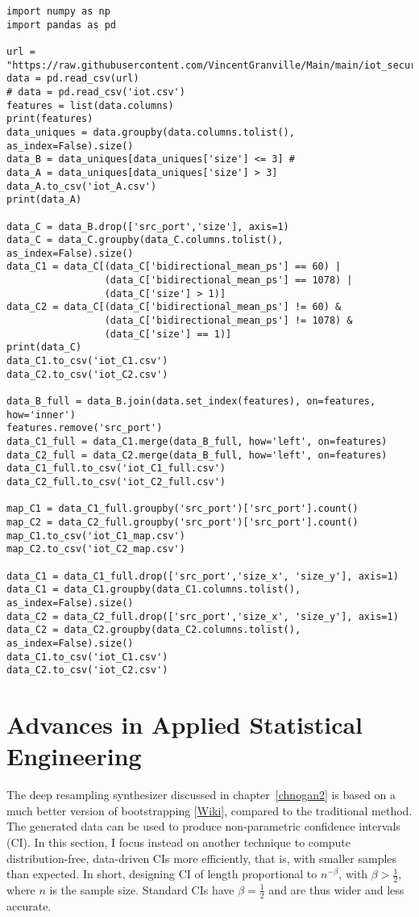 \documentclass[oneside,10pt]{book}
\begin{document}
\begin{lstlisting}
import numpy as np
import pandas as pd

url = "https://raw.githubusercontent.com/VincentGranville/Main/main/iot_security.csv"
data = pd.read_csv(url)
# data = pd.read_csv('iot.csv')
features = list(data.columns)
print(features)
data_uniques = data.groupby(data.columns.tolist(), as_index=False).size()
data_B = data_uniques[data_uniques['size'] <= 3] #
data_A = data_uniques[data_uniques['size'] > 3]
data_A.to_csv('iot_A.csv')
print(data_A)

data_C = data_B.drop(['src_port','size'], axis=1)
data_C = data_C.groupby(data_C.columns.tolist(), as_index=False).size()
data_C1 = data_C[(data_C['bidirectional_mean_ps'] == 60) |
                 (data_C['bidirectional_mean_ps'] == 1078) |
                 (data_C['size'] > 1)]
data_C2 = data_C[(data_C['bidirectional_mean_ps'] != 60) &
                 (data_C['bidirectional_mean_ps'] != 1078) &
                 (data_C['size'] == 1)]
print(data_C)
data_C1.to_csv('iot_C1.csv')
data_C2.to_csv('iot_C2.csv')

data_B_full = data_B.join(data.set_index(features), on=features, how='inner')
features.remove('src_port')
data_C1_full = data_C1.merge(data_B_full, how='left', on=features)
data_C2_full = data_C2.merge(data_B_full, how='left', on=features)
data_C1_full.to_csv('iot_C1_full.csv')
data_C2_full.to_csv('iot_C2_full.csv')

map_C1 = data_C1_full.groupby('src_port')['src_port'].count()
map_C2 = data_C2_full.groupby('src_port')['src_port'].count()
map_C1.to_csv('iot_C1_map.csv')
map_C2.to_csv('iot_C2_map.csv')

data_C1 = data_C1_full.drop(['src_port','size_x', 'size_y'], axis=1)
data_C1 = data_C1.groupby(data_C1.columns.tolist(), as_index=False).size()
data_C2 = data_C2_full.drop(['src_port','size_x', 'size_y'], axis=1)
data_C2 = data_C2.groupby(data_C2.columns.tolist(), as_index=False).size()
data_C1.to_csv('iot_C1.csv')
data_C2.to_csv('iot_C2.csv')
\end{lstlisting}



\section{Advances in Applied Statistical Engineering}

The deep resampling synthesizer discussed in chapter~\ref{chnogan2} is based on a much better version of
 \textcolor{index}{bootstrapping} [\href{https://en.wikipedia.org/wiki/Bootstrapping_(statistics)}{Wiki}], compared to the traditional method. The generated data
 can be used to produce non-parametric \textcolor{index}{confidence intervals} (CI). In this section, I focus instead on another
 technique to compute distribution-free, data-driven CIs more efficiently, that is, with smaller samples than expected.  In short, designing CI
 of length proportional to $n^{-\beta}$, with $\beta>\frac{1}{2}$, where $n$ is the sample size. Standard CIs have $\beta = \frac{1}{2}$ and are thus wider and less accurate.
\end{document}
